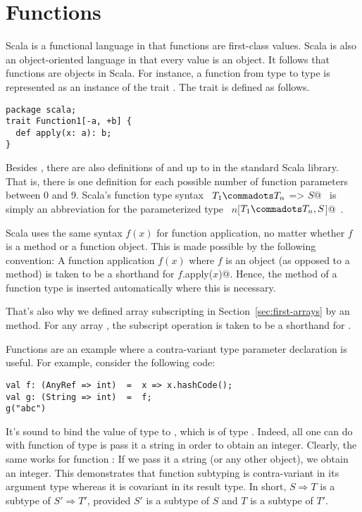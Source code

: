 \section{Functions}\label{sec:functions}

Scala is a functional language in that functions are first-class
values.  Scala is also an object-oriented language in that every value
is an object.  It follows that functions are objects in Scala.  For
instance, a function from type  to type  is
represented as an instance of the trait .
The  trait is defined as follows.
\begin{lstlisting}
package scala;
trait Function1[-a, +b] {
  def apply(x: a): b;
}
\end{lstlisting}
Besides , there are also definitions of
 and  up to  in the
standard Scala library. That is, there is one definition for each
possible number of function parameters between 0 and 9.  Scala's
function type syntax ~\lstinline@$T_1 \commadots T_n$ => $S$@~ is
simply an abbreviation for the parameterized type
~\lstinline@Function$n$[$T_1 \commadots T_n, S$]@~.

Scala uses the same syntax $f(x)$ for function application, no matter
whether $f$ is a method or a function object. This is made possible by
the following convention: A function application $f(x)$ where $f$ is
an object (as opposed to a method) is taken to be a shorthand for
\lstinline@$f$.apply($x$)@. Hence, the  method of a
function type is inserted automatically where this is necessary.

That's also why we defined array subscripting in
Section~\ref{sec:first-arrays} by an  method.  For any
array , the subscript operation  is taken to be a
shorthand for .

Functions are an example where a contra-variant type parameter
declaration is useful. For example, consider the following code:
\begin{lstlisting} 
val f: (AnyRef => int)  =  x => x.hashCode();
val g: (String => int)  =  f;
g("abc")
\end{lstlisting}
It's sound to bind the value  of type  to
, which is of type . Indeed, all one can
do with function of type  is pass it a string in
order to obtain an integer. Clearly, the same works for function
: If we pass it a string (or any other object), we obtain an
integer.  This demonstrates that function subtyping is contra-variant
in its argument type whereas it is covariant in its result type.
In short, $S \Rightarrow T$ is a subtype of $S' \Rightarrow T'$, provided
$S'$ is a subtype of $S$ and $T$ is a subtype of $T'$.

